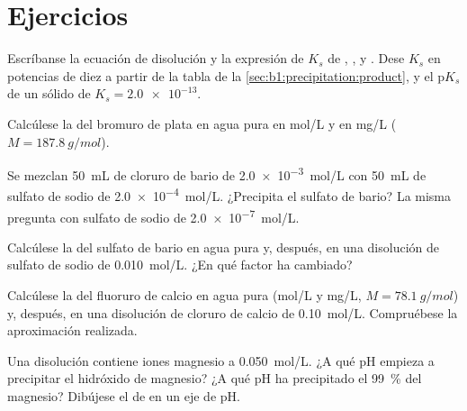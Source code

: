 \section{Ejercicios}

\begin{exercise}[$\star$]\label{exo:b1:precipitation:1}
Escríbanse la ecuación de disolución y la expresión de $K_s$ de
, ,  y . Dese $K_s$ en
potencias de diez a partir de la tabla de la \cref{sec:b1:precipitation:product},
y el $\mathrm{p}K_s$ de un sólido de $K_s = \num{2.0e-13}$.
\end{exercise}

\begin{exercise}[$\star$]\label{exo:b1:precipitation:2}
Calcúlese la  del bromuro de plata en agua pura en
\unit{mol/L} y en \unit{mg/L} ($M = \qty{187.8}{g/mol}$).
\end{exercise}

\begin{exercise}[$\star$]\label{exo:b1:precipitation:3}
Se mezclan \qty{50}{mL} de cloruro de bario de \qty{2.0e-3}{mol/L} con
\qty{50}{mL} de sulfato de sodio de \qty{2.0e-4}{mol/L}. ¿Precipita el
sulfato de bario? La misma pregunta con sulfato de sodio de
\qty{2.0e-7}{mol/L}.
\end{exercise}

\begin{exercise}[$\star$]\label{exo:b1:precipitation:4}
Calcúlese la  del sulfato de bario en agua pura y, después,
en una disolución de sulfato de sodio de \qty{0.010}{mol/L}. ¿En qué
factor ha cambiado?
\end{exercise}

\begin{exercise}[$\star\star$]\label{exo:b1:precipitation:5}
Calcúlese la  del fluoruro de calcio en agua pura
(\unit{mol/L} y
\unit{mg/L}, $M = \qty{78.1}{g/mol}$) y, después, en una disolución de
cloruro de calcio de \qty{0.10}{mol/L}. Compruébese la aproximación
realizada.
\end{exercise}

\begin{exercise}[$\star\star$]\label{exo:b1:precipitation:6}
Una disolución contiene iones magnesio a \qty{0.050}{mol/L}. ¿A qué pH
empieza a precipitar el hidróxido de magnesio? ¿A qué pH ha precipitado
el \qty{99}{\percent} del magnesio? Dibújese el  de
 en un eje de pH.
\end{exercise}

